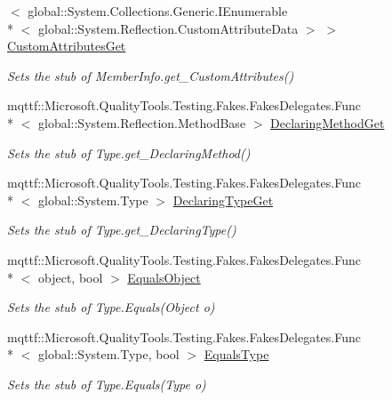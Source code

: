 \begin{DoxyCompactItemize}
$<$ global\-::\-System.\-Collections.\-Generic.\-I\-Enumerable\\*
$<$ global\-::\-System.\-Reflection.\-Custom\-Attribute\-Data $>$ $>$ \hyperlink{class_system_1_1_fakes_1_1_stub_type_a47586c9b653221579f7851bdf9c51fe5}{Custom\-Attributes\-Get}
\begin{DoxyCompactList}\small\item\em Sets the stub of Member\-Info.\-get\-\_\-\-Custom\-Attributes()\end{DoxyCompactList}\item 
mqttf\-::\-Microsoft.\-Quality\-Tools.\-Testing.\-Fakes.\-Fakes\-Delegates.\-Func\\*
$<$ global\-::\-System.\-Reflection.\-Method\-Base $>$ \hyperlink{class_system_1_1_fakes_1_1_stub_type_abd934a1b5fbf98b488c4af391a3ba95e}{Declaring\-Method\-Get}
\begin{DoxyCompactList}\small\item\em Sets the stub of Type.\-get\-\_\-\-Declaring\-Method()\end{DoxyCompactList}\item 
mqttf\-::\-Microsoft.\-Quality\-Tools.\-Testing.\-Fakes.\-Fakes\-Delegates.\-Func\\*
$<$ global\-::\-System.\-Type $>$ \hyperlink{class_system_1_1_fakes_1_1_stub_type_a177032c22a68251e22b44329ce78c059}{Declaring\-Type\-Get}
\begin{DoxyCompactList}\small\item\em Sets the stub of Type.\-get\-\_\-\-Declaring\-Type()\end{DoxyCompactList}\item 
mqttf\-::\-Microsoft.\-Quality\-Tools.\-Testing.\-Fakes.\-Fakes\-Delegates.\-Func\\*
$<$ object, bool $>$ \hyperlink{class_system_1_1_fakes_1_1_stub_type_a905b00a3bf43c47ab9103ee144343071}{Equals\-Object}
\begin{DoxyCompactList}\small\item\em Sets the stub of Type.\-Equals(\-Object o)\end{DoxyCompactList}\item 
mqttf\-::\-Microsoft.\-Quality\-Tools.\-Testing.\-Fakes.\-Fakes\-Delegates.\-Func\\*
$<$ global\-::\-System.\-Type, bool $>$ \hyperlink{class_system_1_1_fakes_1_1_stub_type_a54b82e80670c47bf9aeb8eaec81f0208}{Equals\-Type}
\begin{DoxyCompactList}\small\item\em Sets the stub of Type.\-Equals(\-Type o)\end{DoxyCompactList}\item 

\end{DoxyCompactItemize}
